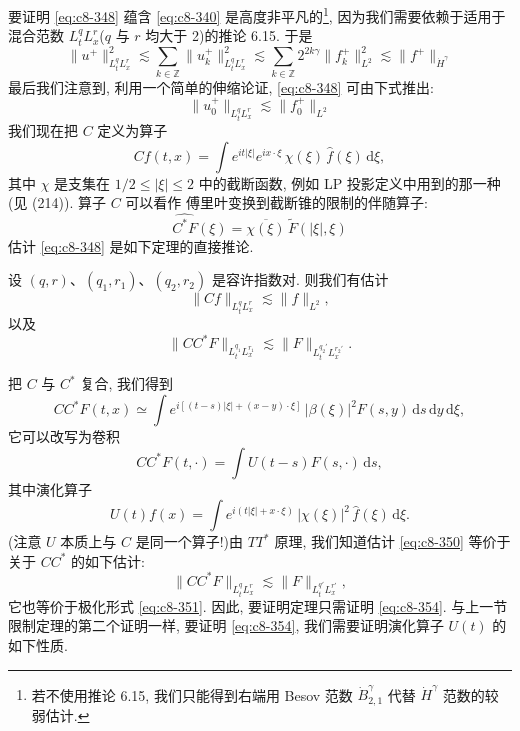 要证明 \eqref{eq:c8-348} 蕴含 \eqref{eq:c8-340} 是高度非平凡的\footnote{若不使用推论 6.15, 我们只能得到右端用 Besov 范数 $\dot{B}_{2, 1}^{\gamma}$ 代替 $\dot{H}^{\gamma}$ 范数的较弱估计. }, 因为我们需要依赖于适用于混合范数 $L_t^q L_x^r$($q$ 与 $r$ 均大于 2)的推论 6.15. 于是
\[
\|u^{+}\|_{L_t^q L_x^r}^2\lesssim\sum_{k\in\mathbb{Z}}\|u_{k}^{+}\|_{L_t^q L_x^r}^2\lesssim\sum_{k\in\mathbb{Z}}2^{2k\gamma}\|f_{k}^{+}\|_{L^2}^2\lesssim\|f^{+}\|_{\dot{H}^\gamma}
\]
最后我们注意到, 利用一个简单的伸缩论证, \eqref{eq:c8-348} 可由下式推出:
\begin{equation}
\|u_{0}^{+}\|_{L_t^q L_x^r}\lesssim\|f_{0}^{+}\|_{L^2}\label{eq:c8-348}
\end{equation}
我们现在把 $C$ 定义为算子
\begin{equation}
Cf(t, x)=\int e^{it|\xi|}e^{ix\cdot\xi}\, \chi(\xi)\, \widehat{f}(\xi)\, \mathrm{d}\xi, \label{eq:c8-349}
\end{equation}
其中 $\chi$ 是支集在 $1/2\leq|\xi|\leq2$ 中的截断函数, 例如 LP 投影定义中用到的那一种(见 (214)). 算子 $C$ 可以看作 傅里叶变换到截断锥的限制的伴随算子:
\[
\widehat{C^{*}F}(\xi)=\overline{\chi(\xi)}\, \widetilde{F}(|\xi|, \xi)
\]
估计 \eqref{eq:c8-348} 是如下定理的直接推论. 

\begin{theorem}\label{thm:c8-0.39}
设 $(q, r)$、$(q_1, r_1)$、$(q_2, r_2)$ 是容许指数对. 则我们有估计
\begin{equation}
\|Cf\|_{L_t^q L_x^r}\lesssim\|f\|_{L^2}, \label{eq:c8-350}
\end{equation}
以及
\begin{equation}
\|CC^{*}F\|_{L_t^{q_1} L_x^{r_1}}\lesssim\|F\|_{L_t^{q_2'} L_x^{r_2'}}.\label{eq:c8-351}
\end{equation}
\end{theorem}

把 $C$ 与 $C^{*}$ 复合, 我们得到
\[
CC^{*}F(t, x)\simeq\int e^{i[(t-s)|\xi|+(x-y)\cdot\xi]}\, |\beta(\xi)|^2 F(s, y)\, \mathrm{d}s\, \mathrm{d}y\, \mathrm{d}\xi, 
\]
它可以改写为卷积
\begin{equation}
CC^{*}F(t, \cdot)=\int U(t-s)F(s, \cdot)\, \mathrm{d}s, \label{eq:c8-352}
\end{equation}
其中演化算子
\begin{equation}
U(t)f(x)=\int e^{i(t|\xi|+x\cdot\xi)}\, |\chi(\xi)|^2\, \widehat{f}(\xi)\, \mathrm{d}\xi .\label{eq:c8-353}
\end{equation}
(注意 $U$ 本质上与 $C$ 是同一个算子!)由 $TT^{*}$ 原理, 我们知道估计 \eqref{eq:c8-350} 等价于关于 $CC^{*}$ 的如下估计:
\begin{equation}
\|CC^{*}F\|_{L_t^q L_x^r}\lesssim\|F\|_{L_t^{q'} L_x^{r'}}, \label{eq:c8-354}
\end{equation}
它也等价于极化形式 \eqref{eq:c8-351}. 因此, 要证明定理只需证明 \eqref{eq:c8-354}. 与上一节限制定理的第二个证明一样, 要证明 \eqref{eq:c8-354}, 我们需要证明演化算子 $U(t)$ 的如下性质. 

